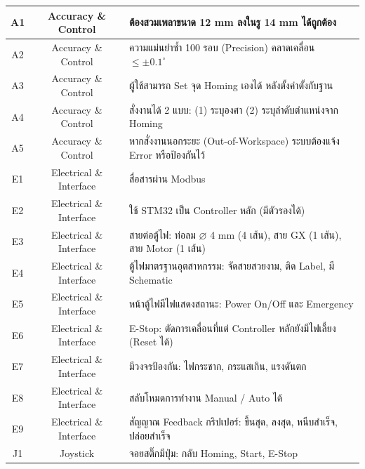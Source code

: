 \begin{table}[H]
\begin{tabular}{|c|c|p{10cm}|}
    A1  & Accuracy \& Control & ต้องสวมเพลาขนาด 12 mm ลงในรู 14 mm ได้ถูกต้อง \\
    \hline
    A2  & Accuracy \& Control & ความแม่นยำซ้ำ 100 รอบ (Precision) คลาดเคลื่อน $\leq \pm 0.1^{\circ}$ \\
    \hline
    A3  & Accuracy \& Control & ผู้ใช้สามารถ Set จุด Homing เองได้ หลังตั้งค่าตั้งกับฐาน \\
    \hline
    A4  & Accuracy \& Control & สั่งงานได้ 2 แบบ: (1) ระบุองศา (2) ระบุลำดับตำแหน่งจาก Homing \\
    \hline
    A5  & Accuracy \& Control & หากสั่งงานนอกระยะ (Out-of-Workspace) ระบบต้องแจ้ง Error หรือป้องกันไว้ \\
    \hline
    E1  & Electrical \& Interface & สื่อสารผ่าน Modbus \\
    \hline
    E2  & Electrical \& Interface & ใช้ STM32 เป็น Controller หลัก (มีตัวรองได้) \\
    \hline
    E3  & Electrical \& Interface & สายต่อตู้ไฟ: ท่อลม $\varnothing$ 4 mm (4 เส้น), สาย GX (1 เส้น), สาย Motor (1 เส้น) \\
    \hline
    E4  & Electrical \& Interface & ตู้ไฟมาตรฐานอุตสาหกรรม: จัดสายสวยงาม, ติด Label, มี Schematic \\
    \hline
    E5  & Electrical \& Interface & หน้าตู้ไฟมีไฟแสดงสถานะ: Power On/Off และ Emergency \\
    \hline
    E6  & Electrical \& Interface & E-Stop: ตัดการเคลื่อนที่แต่ Controller หลักยังมีไฟเลี้ยง (Reset ได้) \\
    \hline
    E7  & Electrical \& Interface & มีวงจรป้องกัน: ไฟกระชาก, กระแสเกิน, แรงดันตก \\
    \hline
    E8  & Electrical \& Interface & สลับโหมดการทำงาน Manual / Auto ได้ \\
    \hline
    E9  & Electrical \& Interface & สัญญาณ Feedback กริปเปอร์: ขึ้นสุด, ลงสุด, หนีบสำเร็จ, ปล่อยสำเร็จ \\
    \hline
    J1  & Joystick & จอยสติ๊กมีปุ่ม: กลับ Homing, Start, E-Stop \\
    \hline
  \end{tabular}
\end{table}